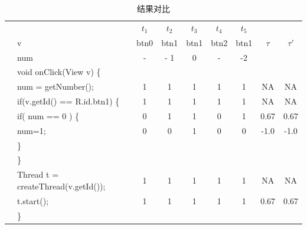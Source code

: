 \begin{table}[!ht]
	
	\caption{结果对比}

	
	\label{tab:result}
	\begin{center}
		\scriptsize	
		
		
		
		\begin{tabular}{|rl*{5} {|c}|c|c|}
			
						\hline
			
			&                    & $t_1$ & $t_2$ & $t_3$ & $t_4$ & $t_5$ & ~&  ~\\
			&v &btn0& btn1& btn1& btn2 &btn1 & $\tau$ &  $\tau'$   \\
			&num&   - & - 1& 0& -& -2& &\\
			\hline
			
			&void onClick(View v) \{                       &   &   &   &   &   &      &         \\
			
			&\quad num = getNumber();                   & 1 & 1 & 1 & 1 & 1 &  NA  &  NA    \\
			
			&\quad if(v.getId() == R.id.btn1) \{           & 1 & 1 & 1 & 1 & 1 &  NA    &  NA \\
			
			&\quad \quad if( num == 0 ) \{                    & 0 & 1 & 1 & 0 & 1 & 0.67   & 0.67 \\
			
			&\quad \quad \quad num=1;                         & 0 & 0 & 1 & 0 & 0 & -1.0  &-1.0\\
			
			&\quad \quad \}                                   &   &   &   &   &   &       &            \\
			
			&\quad   \}                                       &   &   &   &   &   &      &            \\
			
			&\quad Thread t = createThread(v.getId());          & 1 & 1 & 1 & 1 & 1 & NA&  NA  \\
			
			&\quad t.start();                                 & 1 & 1 & 1 & 1 & 1 & 0.67   & 0.67 \\
			
			&\}                                              &   &   &   &   &   &      &             \\
			

\end{tabular}
\end{center}
\end{table}
